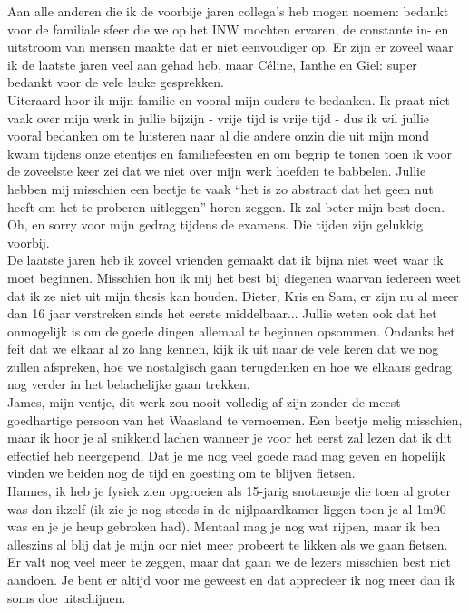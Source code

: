 \noindent Aan alle anderen die ik de voorbije jaren collega's heb mogen noemen: bedankt voor de familiale sfeer die we op het INW mochten ervaren, de constante in- en uitstroom van mensen maakte dat er niet eenvoudiger op. Er zijn er zoveel waar ik de laatste jaren veel aan gehad heb, maar C\'eline, Ianthe en Giel: super bedankt voor de vele leuke gesprekken.\\

\noindent Uiteraard hoor ik mijn familie en vooral mijn ouders te bedanken. Ik praat niet vaak over mijn werk in jullie bijzijn - vrije tijd is vrije tijd - dus ik wil jullie vooral bedanken om te luisteren naar al die andere onzin die uit mijn mond kwam tijdens onze etentjes en familiefeesten en om begrip te tonen toen ik voor de zoveelste keer zei dat we niet over mijn werk hoefden te babbelen. Jullie hebben mij misschien een beetje te vaak ``het is zo abstract dat het geen nut heeft om het te proberen uitleggen'' horen zeggen. Ik zal beter mijn best doen. Oh, en sorry voor mijn gedrag tijdens de examens. Die tijden zijn gelukkig voorbij.\\

\noindent De laatste jaren heb ik zoveel vrienden gemaakt dat ik bijna niet weet waar ik moet beginnen. Misschien hou ik mij het best bij diegenen waarvan iedereen weet dat ik ze niet uit mijn thesis kan houden. Dieter, Kris en Sam, er zijn nu al meer dan 16 jaar verstreken sinds het eerste middelbaar... Jullie weten ook dat het onmogelijk is om de goede dingen allemaal te beginnen opsommen. Ondanks het feit dat we elkaar al zo lang kennen, kijk ik uit naar de vele keren dat we nog zullen afspreken, hoe we nostalgisch gaan terugdenken en hoe we elkaars gedrag nog verder in het belachelijke gaan trekken.\\

\noindent James, mijn ventje, dit werk zou nooit volledig af zijn zonder de meest goedhartige persoon van het Waasland te vernoemen. Een beetje melig misschien, maar ik hoor je al snikkend lachen wanneer je voor het eerst zal lezen dat ik dit effectief heb neergepend. Dat je me nog veel goede raad mag geven en hopelijk vinden we beiden nog de tijd en goesting om te blijven fietsen.\\

\noindent Hannes, ik heb je fysiek zien opgroeien als 15-jarig snotneusje die toen al groter was dan ikzelf (ik zie je nog steeds in de nijlpaardkamer liggen toen je al 1m90 was en je je heup gebroken had). Mentaal mag je nog wat rijpen, maar ik ben alleszins al blij dat je mijn oor niet meer probeert te likken als we gaan fietsen. Er valt nog veel meer te zeggen, maar dat gaan we de lezers misschien best niet aandoen. Je bent er altijd voor me geweest en dat apprecieer ik nog meer dan ik soms doe uitschijnen.\\

